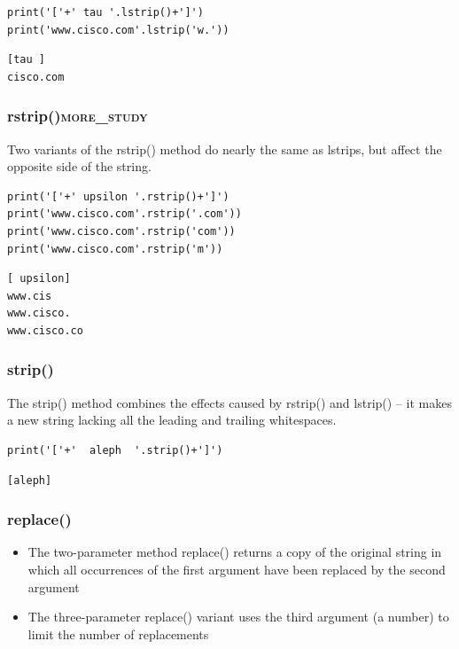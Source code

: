 \documentclass[11pt]{article}
\begin{document}
\begin{verbatim}
print('['+' tau '.lstrip()+']')
print('www.cisco.com'.lstrip('w.'))
\end{verbatim}

\begin{verbatim}
[tau ]
cisco.com
\end{verbatim}

\subsubsection{rstrip()\hfill{}\textsc{more\_study}}
\label{sec:org55a34bf}
Two variants of the rstrip() method do nearly the same as lstrips, but
affect the opposite side of the string.

\begin{verbatim}
print('['+' upsilon '.rstrip()+']')
print('www.cisco.com'.rstrip('.com'))
print('www.cisco.com'.rstrip('com'))
print('www.cisco.com'.rstrip('m'))
\end{verbatim}

\begin{verbatim}
[ upsilon]
www.cis
www.cisco.
www.cisco.co
\end{verbatim}

\subsubsection{strip()}
\label{sec:org15fa05c}
The strip() method combines the effects caused by rstrip() and
lstrip() – it makes a new string lacking all the leading and trailing
whitespaces.

\begin{verbatim}
print('['+'  aleph  '.strip()+']')
\end{verbatim}

\begin{verbatim}
[aleph]
\end{verbatim}

\subsubsection{replace()}
\label{sec:org725d766}
\begin{itemize}
\item The two-parameter method replace() returns a copy of the original
string in which all occurrences of the first argument have been
replaced by the second argument
\item The three-parameter replace() variant uses the third argument (a
number) to limit the number of replacements
\end{itemize}
\end{document}
